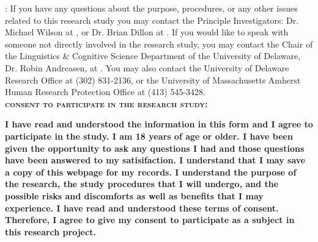 \documentclass[11pt,letterpaper,onecolumn,onepage]{wilson}
\begin{document}
	\textbf{}: If you have any questions about the purpose, procedures, or any other issues related to this research study you may contact the Principle Investigators: Dr. Michael Wilson at \href{mailto:mawilson@udel.edu}{\textcolor{delblue}{}}, or Dr. Brian Dillon at \href{mailto:bwdillon@umass.edu}{\textcolor{delblue}{}}. If you would like to speak with someone not directly involved in the research study, you may contact the Chair of the Linguistics \& Cognitive Science Department of the University of Delaware, Dr. Robin Andreasen, at \href{mailto:robina@udel.edu}{\textcolor{delblue}{}}. You may also contact the University of Delaware Research Office at (302) 831-2136, or the University of Massachusetts Amherst Human Research Protection Office at (413) 545-3428.\\
	
	\textbf{\textsc{consent to participate in the research study}:}
	
	\textbf{I have read and understood the information in this form and I agree to participate in the study. I am 18 years of age or older. I have been given the opportunity to ask any questions I had and those questions have been answered to my satisifaction. I understand that I may save a copy of this webpage for my records. I understand the purpose of the research, the study procedures that I will undergo, and the possible risks and discomforts as well as benefits that I may experience. I have read and understood these terms of consent. Therefore, I agree to give my consent to participate as a subject in this research project.}
\end{document}
